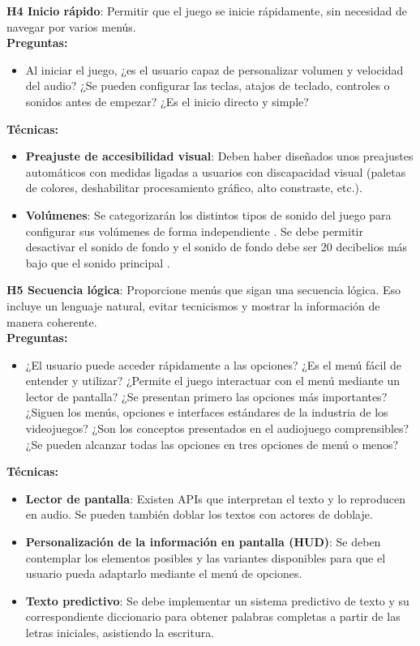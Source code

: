 \textbf{H4 Inicio rápido}: Permitir que el juego se inicie rápidamente, sin necesidad de navegar por varios menús.\cite{teixeiraborgesFairPlayGuidelines2018a}\\
\textbf{Preguntas:}
\begin{itemize}
	\item Al iniciar el juego, ¿es el usuario capaz de personalizar volumen y velocidad del audio? ¿Se pueden configurar las teclas, atajos de teclado, controles o sonidos antes de empezar? ¿Es el inicio directo y simple?
\end{itemize}
\textbf{Técnicas:}
\begin{itemize}
	\item \textbf{Preajuste de accesibilidad visual}: Deben haber diseñados unos preajustes automáticos con medidas ligadas a usuarios con discapacidad visual (paletas de colores, deshabilitar procesamiento gráfico, alto constraste, etc.). \cite{LibroBlancoAccesibilidad} 
	\item \textbf{Volúmenes}: Se categorizarán los distintos tipos de sonido del juego para configurar sus volúmenes de forma independiente \cite{LibroBlancoAccesibilidad}. Se debe permitir desactivar el sonido de fondo y el sonido de fondo debe ser 20 decibelios más bajo que el sonido principal \cite{WebContentAccessibility}.
\end{itemize}
\textbf{H5 Secuencia lógica}: Proporcione menús que sigan una secuencia lógica. Eso incluye un lenguaje natural, evitar tecnicismos y mostrar la información de manera coherente. \cite{araujoMobileAudioGames2017a} \cite{deborbacamposUsabilityAccessibilityGameplay2016} \cite{teixeiraborgesFairPlayGuidelines2018a}\\
\textbf{Preguntas:}
\begin{itemize}
	\item ¿El usuario puede acceder rápidamente a las opciones? ¿Es el menú fácil de entender y utilizar? ¿Permite el juego interactuar con el menú mediante un lector de pantalla? ¿Se presentan primero las opciones más importantes? ¿Siguen los menús, opciones e interfaces estándares de la industria de los videojuegos? ¿Son los conceptos presentados en el audiojuego comprensibles? ¿Se pueden alcanzar todas las opciones en tres opciones de menú o menos?
\end{itemize}
\textbf{Técnicas:}
\begin{itemize}
	\item \textbf{Lector de pantalla}: Existen APIs que interpretan el texto y lo reproducen en audio. Se pueden también doblar los textos con actores de doblaje. \cite{LibroBlancoAccesibilidad} 
	\item \textbf{Personalización de la información en pantalla (HUD)}: Se deben contemplar los elementos posibles y las variantes disponibles para que el usuario pueda adaptarlo mediante el menú de opciones. \cite{LibroBlancoAccesibilidad} 
	\item \textbf{Texto predictivo}: Se debe implementar un sistema predictivo de texto y su correspondiente diccionario para obtener palabras completas a partir de las letras iniciales, asistiendo la escritura. \cite{LibroBlancoAccesibilidad}
\end{itemize}
